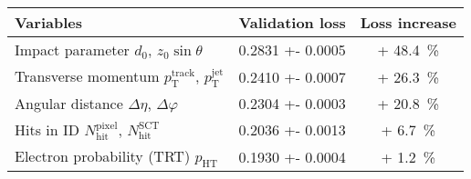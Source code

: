 \begin{tabular}{p{5cm}S[table-format=1.4(4)]S[retain-explicit-plus, table-format=+2.1]}
  \toprule
  {Variables} & {Validation loss} & {Loss increase} \\
  \midrule
  \parbox[c]{\hsize}{Impact parameter \newline $d_0$, $z_0 \sin\theta$}
          & 0.2831 +- 0.0005 & + 48.4 \,\si{\percent} \\[1.2em]
  \parbox[c]{\hsize}{Transverse momentum \newline $p_\text{T}^\text{track}$, $p_\text{T}^\text{jet}$}
          & 0.2410 +- 0.0007 & + 26.3 \,\si{\percent} \\[1.2em]
  \parbox[c]{\hsize}{Angular distance \newline $\Delta \eta$, $\Delta \varphi$}
          & 0.2304 +- 0.0003 & + 20.8 \,\si{\percent} \\[1.2em]
  \parbox[c]{\hsize}{Hits in ID \newline $N_\text{hit}^\text{pixel}$, $N_\text{hit}^\text{SCT}$}
          & 0.2036 +- 0.0013 & + 6.7 \,\si{\percent} \\[1.2em]
  \parbox[c]{\hsize}{Electron probability (TRT) \newline $p_\text{HT}$}
          & 0.1930 +- 0.0004 & + 1.2 \,\si{\percent}\\
  \bottomrule
\end{tabular}

